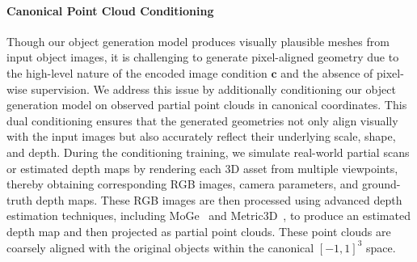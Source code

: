 \paragraph{Canonical Point Cloud Conditioning} 
Though our object generation model produces visually plausible meshes from input object images, it is challenging to generate pixel-aligned geometry due to the high-level nature of the encoded image condition $\bm{c}$ and the absence of pixel-wise supervision. We address this issue by additionally conditioning our object generation model on observed partial point clouds in canonical coordinates.
%
This dual conditioning ensures that the generated geometries not only align visually with the input images but also accurately reflect their underlying scale, shape, and depth. 
During the conditioning training, we simulate real-world partial scans or estimated depth maps by rendering each 3D asset from multiple viewpoints, thereby obtaining corresponding RGB images, camera parameters, and ground-truth depth maps. These RGB images are then processed using advanced depth estimation techniques, including MoGe~\cite{wang2024moge} and Metric3D~\cite{yang2024depth}, to produce an estimated depth map and then projected as partial point clouds. These point clouds are coarsely aligned with the original objects within the canonical $[-1,1]^3$ space.


